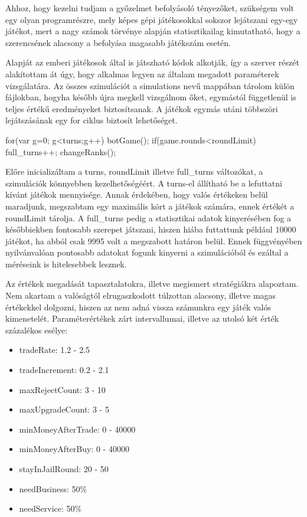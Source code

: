 

Ahhoz, hogy kezelni tudjam a győzelmet befolyásoló tényezőket, szükségem volt egy olyan programrészre, mely képes gépi játékosokkal sokszor lejátszani egy-egy játékot, mert a nagy számok törvénye alapján statisztikailag kimutatható, hogy a szerencsének alacsony a befolyása magasabb játékszám esetén.

	Alapját az emberi játékosok által is játszható kódok alkotják, így a szerver részét alakítottam át úgy, hogy alkalmas legyen az általam megadott paraméterek vizsgálatára. Az összes szimulációt a simulations nevű mappában tárolom külön fájlokban, hogyha később újra megkell vizsgálnom őket, egymástól függetlenül is teljes értékű eredményeket biztosítsanak.  A játékok egymás utáni többszöri lejátszásának egy for ciklus biztosít lehetőséget.

\begin{javascript}
for(var g=0; g<turns;g++){
  botGame();
  if(game.rounds<roundLimit){
    full_turns++;
    changeRanks();
  }
}
\end{javascript}


Előre inicializáltam a turns, roundLimit illetve full\_turns változókat, a szimulációk könnyebben kezelhetőségéért. A turns-el állítható be a lefuttatni kívánt játékok mennyisége. Annak érdekében, hogy valós értékeken belül maradjunk, megszabtam  egy maximális kört a játékok számára, ennek értékét a roundLimit tárolja. A full\_turns pedig a statisztikai adatok kinyerésében fog a későbbiekben fontosabb szerepet játszani, hiszen hiába futtattunk például 10000 játékot, ha abból csak 9995 volt a megszabott határon belül. Ennek függvényében nyilvánvalóan pontosabb adatokat fogunk kinyerni a szimulációból és ezáltal a méréseink is hitelesebbek lesznek.



Az értékek megadását tapasztalatokra, illetve megismert stratégiákra alapoztam. Nem akartam a valóságtól elrugaszkodott túlzottan alacsony, illetve magas értékekkel dolgozni, hiszen az nem adná vissza számunkra egy játék valós kimenetelét. Paraméterértékek zárt intervallumai, illetve az utolsó két érték százalékos esélye:

\begin{itemize}
	\item tradeRate: 1.2 - 2.5
	\item tradeIncrement: 0.2 - 2.1
	\item maxRejectCount: 3 - 10
	\item maxUpgradeCount: 3 - 5
	\item minMoneyAfterTrade: 0 - 40000
	\item minMoneyAfterBuy: 0 - 40000
	\item stayInJailRound: 20 - 50
	\item needBusiness: 50\%
	\item needService: 50\%
\end{itemize}

